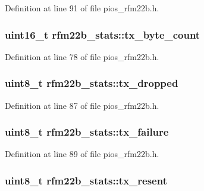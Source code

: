 \-Definition at line 91 of file pios\-\_\-rfm22b.\-h.

\hypertarget{structrfm22b__stats_a3f3b0ee5d6c3557da05b35b54102da71}{
\subsubsection[{tx\-\_\-byte\-\_\-count}]{\setlength{\rightskip}{0pt plus 5cm}uint16\-\_\-t {\bf rfm22b\-\_\-stats\-::tx\-\_\-byte\-\_\-count}}}\label{structrfm22b__stats_a3f3b0ee5d6c3557da05b35b54102da71}


\-Definition at line 78 of file pios\-\_\-rfm22b.\-h.

\hypertarget{structrfm22b__stats_a40ecedccb96317654da5118ca167bfe4}{
\subsubsection[{tx\-\_\-dropped}]{\setlength{\rightskip}{0pt plus 5cm}uint8\-\_\-t {\bf rfm22b\-\_\-stats\-::tx\-\_\-dropped}}}\label{structrfm22b__stats_a40ecedccb96317654da5118ca167bfe4}


\-Definition at line 87 of file pios\-\_\-rfm22b.\-h.

\hypertarget{structrfm22b__stats_ae443df4225a025395b7fa6caea562a74}{
\subsubsection[{tx\-\_\-failure}]{\setlength{\rightskip}{0pt plus 5cm}uint8\-\_\-t {\bf rfm22b\-\_\-stats\-::tx\-\_\-failure}}}\label{structrfm22b__stats_ae443df4225a025395b7fa6caea562a74}


\-Definition at line 89 of file pios\-\_\-rfm22b.\-h.

\hypertarget{structrfm22b__stats_aad4359c902f65048dd74b5b5a4d9482d}{
\subsubsection[{tx\-\_\-resent}]{\setlength{\rightskip}{0pt plus 5cm}uint8\-\_\-t {\bf rfm22b\-\_\-stats\-::tx\-\_\-resent}}}\label{structrfm22b__stats_aad4359c902f65048dd74b5b5a4d9482d}


